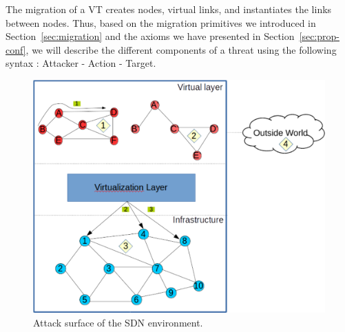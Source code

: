 \label{sec:attacker-model}
The migration of a VT creates nodes, virtual links, and instantiates the links between nodes.
Thus, based on  the migration primitives we introduced in Section~\ref{sec:migration} and the axioms we have presented in Section~\ref{sec:prop-conf}, 
we will describe the different components of a threat using the following syntax
: Attacker - Action - Target.

\begin{figure}[t!]
\centering
\includegraphics[scale=0.85]{figures/virtualization-attack-surface}
\caption{Attack surface of the SDN environment.\label{fig:attack-surface}}
\end{figure}

